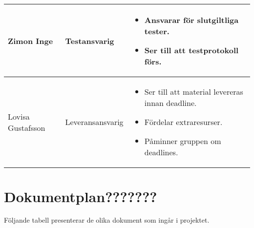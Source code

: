 \documentclass[11pt]{article}
\begin{document}
\begin{flushleft}
\begin{longtable}{| p{.2\linewidth} | p{.2\linewidth} | p{.5\linewidth} |}
Zimon Inge & Testansvarig & \vspace{-\baselineskip}
\begin{itemize}[label={--},leftmargin=*,nosep]
\item Ansvarar för slutgiltliga tester.
\item Ser till att testprotokoll förs.
\vspace{-\baselineskip}
\end{itemize}
\\ \hline

Lovisa Gustafsson & Leveransansvarig & \vspace{-\baselineskip}
\begin{itemize}[label={--},leftmargin=*,nosep]
\item Ser till att material levereras innan deadline.
\item Fördelar extraresurser.
\item Påminner gruppen om deadlines.
\vspace{-\baselineskip}
\end{itemize}
\\ \hline

\end{longtable}

\pagebreak
\section{Dokumentplan???????}
Följande tabell presenterar de olika dokument som ingår i projektet. 


\end{flushleft}
\end{document}

